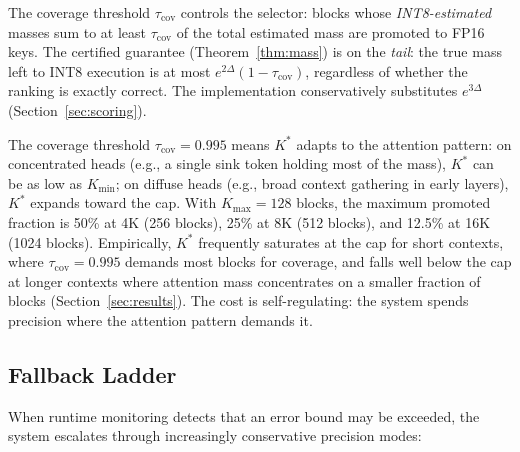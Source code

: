 \documentclass[11pt,a4paper]{article}
\theoremstyle{definition}
\theoremstyle{remark}
\begin{document}
The coverage threshold $\tau_{\mathrm{cov}}$ controls the selector: blocks whose \emph{INT8-estimated} masses sum to at least $\tau_{\mathrm{cov}}$ of the total estimated mass are promoted to FP16 keys.  The certified guarantee (Theorem~\ref{thm:mass}) is on the \emph{tail}: the true mass left to INT8 execution is at most $e^{2\Delta}(1 - \tau_{\mathrm{cov}})$, regardless of whether the ranking is exactly correct.  The implementation conservatively substitutes $e^{3\Delta}$ (Section~\ref{sec:scoring}).

The coverage threshold $\tau_{\mathrm{cov}} = 0.995$ means $K^*$ adapts to the attention pattern: on concentrated heads (e.g., a single sink token holding most of the mass), $K^*$ can be as low as $K_{\min}$; on diffuse heads (e.g., broad context gathering in early layers), $K^*$ expands toward the cap.  With $K_{\max}{=}128$ blocks, the maximum promoted fraction is 50\% at 4K (256 blocks), 25\% at 8K (512 blocks), and 12.5\% at 16K (1024 blocks).  Empirically, $K^*$ frequently saturates at the cap for short contexts, where $\tau_{\mathrm{cov}}{=}0.995$ demands most blocks for coverage, and falls well below the cap at longer contexts where attention mass concentrates on a smaller fraction of blocks (Section~\ref{sec:results}).  The cost is self-regulating: the system spends precision where the attention pattern demands it.

\subsection{Fallback Ladder}
\label{sec:fallback}

When runtime monitoring detects that an error bound may be exceeded, the system escalates through increasingly conservative precision modes:
\end{document}
